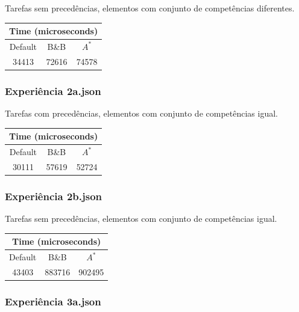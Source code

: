 \documentclass[a4paper,11pt]{article}
\begin{document}
Tarefas sem precedências, elementos com conjunto de competências diferentes.

\begin{center}
	\begin{tabular}{|c|c|c|} 
		\hline
		\multicolumn{3}{|c|}{Time (microseconds)}\\
		\hline
		Default & B\&B & $A^*$\\
		\hline
		34413 & 72616 & 74578\\
		\hline
	\end{tabular}
\end{center}

\subsubsection{Experiência 2a.json}

Tarefas com precedências, elementos com conjunto de competências igual.

\begin{center}
	\begin{tabular}{|c|c|c|} 
		\hline
		\multicolumn{3}{|c|}{Time (microseconds)} \\
		\hline
		Default & B\&B & $A^*$\\
		\hline
		30111 & 57619 & 52724\\
		\hline
	\end{tabular}
\end{center}

\subsubsection{Experiência 2b.json}

Tarefas sem precedências, elementos com conjunto de competências igual.

\begin{center}
	\begin{tabular}{|c|c|c|} 
		\hline
		\multicolumn{3}{|c|}{Time (microseconds)} \\
		\hline
		Default & B\&B & $A^*$\\
		\hline
		43403 & 883716 & 902495\\
		\hline
	\end{tabular}
\end{center}

\subsubsection{Experiência 3a.json}
\end{document}
